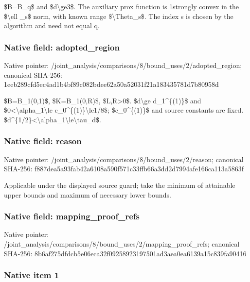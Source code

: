 \documentclass[10pt,a4paper]{article}
\begin{document}
\$B=B\_q\$ and \$d\textbackslash{}ge3\$. The auxiliary prox function is 1strongly convex in the \$\textbackslash{}ell \_s\$ norm, with known range \$\textbackslash{}Theta\_s\$. The index s is chosen by the algorithm and need not equal q.


\subsubsection{Native field: adopted\_region}


Native pointer: /joint\_analysis/comparis\allowbreak{}ons/8/bound\_uses/2/adopt\allowbreak{}ed\_region; canonical SHA-256: 1eeb289cfd5ec4ad1b4bf89c\allowbreak{}082bdee62a50a52031f21a18\allowbreak{}3435781d7b80958d


\$B=B\_1(0,1)\$, \$K=B\_1(0,R)\$, \$L,R>0\$. \$d\textbackslash{}ge d\_1\textasciicircum{}\{(1)\}\$ and \$0<\textbackslash{}alpha\_1\textbackslash{}le c\_0\textasciicircum{}\{(1)\}\textbackslash{}le1/8\$; \$c\_0\textasciicircum{}\{(1)\}\$ and source constants are fixed. \$d\textasciicircum{}\{1/2\}<\textbackslash{}alpha\_1\textbackslash{}le\textbackslash{}tau\_d\$.


\subsubsection{Native field: reason}


Native pointer: /joint\_analysis/comparis\allowbreak{}ons/8/bound\_uses/2/reaso\allowbreak{}n; canonical SHA-256: f887dea5a93fab42a6108a59\allowbreak{}0f571c33ffb66a3dd2d7994a\allowbreak{}fe166ca113a5863f


Applicable under the displayed source guard; take the minimum of attainable upper bounds and maximum of necessary lower bounds.


\subsubsection{Native field: mapping\_proof\_refs}


Native pointer: /joint\_analysis/comparis\allowbreak{}ons/8/bound\_uses/2/mappi\allowbreak{}ng\_proof\_refs; canonical SHA-256: 8b6af275dfdcb5e06eca32f0\allowbreak{}9258923197501ad3aea0ea61\allowbreak{}39a15c839fa90416



\subsubsection{Native item 1}
\end{document}
